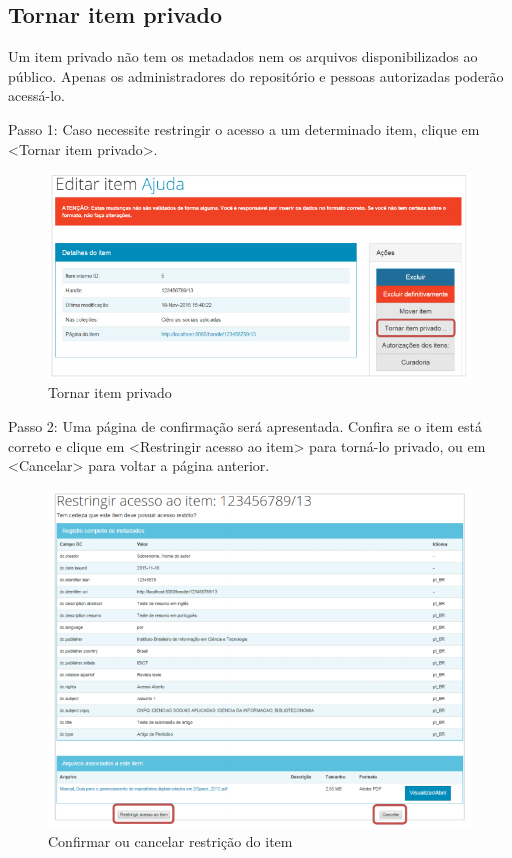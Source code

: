 \documentclass[12pt,hidelinks]{article}
\begin{document}
\newpage

    \subsection{Tornar item privado}
    
    Um item privado não tem os metadados nem os arquivos disponibilizados ao público. Apenas os administradores do repositório e pessoas autorizadas poderão acessá-lo.
    
    \singlespacing
    
    Passo 1: Caso necessite restringir o acesso a um determinado item, clique em <Tornar item privado>.
    
    \begin{figure}[!htp]
                \centering
                \includegraphics[scale=0.7]{figura/Figura106.png}
                \caption{Tornar item privado}
            \label{Rotulo}
        \end{figure}
    
    Passo 2: Uma página de confirmação será apresentada. Confira se o item está correto e clique em <Restringir acesso ao item> para torná-lo privado, ou em <Cancelar> para voltar a página anterior.
    
    \begin{figure}[!htp]
                \centering
                \includegraphics[scale=0.7]{figura/Figura107.png}
                \caption{Confirmar ou cancelar restrição do item}
            \label{Rotulo}
        \end{figure}
        
\end{document}
